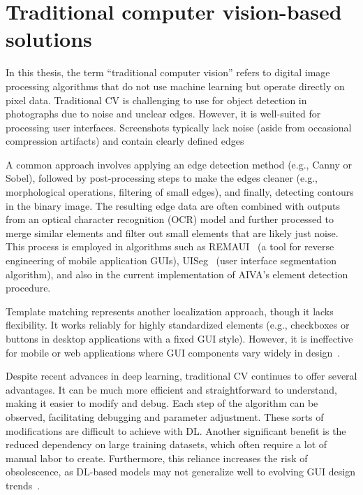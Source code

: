 \documentclass[
  digital,     %
  oneside,     %
  nosansbold,  %
  nocolorbold, %
  lof,         %
  lot,         %
]{fithesis4}
\begin{document}
\section{Traditional computer vision-based solutions}
\label{sec:traditionalCV}

In this thesis, the term \enquote{traditional computer vision} refers to digital image processing algorithms that do not use machine learning but operate directly on pixel data. Traditional CV is challenging to use for object detection in photographs due to noise and unclear edges. However, it is well-suited for processing user interfaces. Screenshots typically lack noise (aside from occasional compression artifacts) and contain clearly defined edges

A common approach involves applying an edge detection method (e.g., Canny or Sobel), followed by post-processing steps to make the edges cleaner (e.g., morphological operations, filtering of small edges), and finally, detecting contours in the binary image. The resulting edge data are often combined with outputs from an optical character recognition (OCR) model and further processed to merge similar elements and filter out small elements that are likely just noise. This process is employed in algorithms such as REMAUI~\cite{remaui} (a tool for reverse engineering of mobile application GUIs), UISeg~\cite{uiseg} (user interface segmentation algorithm), and also in the current implementation of AIVA's element detection procedure.

Template matching represents another localization approach, though it lacks flexibility. It works reliably for highly standardized elements (e.g., checkboxes or buttons in desktop applications with a fixed GUI style). However, it is ineffective for mobile or web applications where GUI components vary widely in design~\cite{ODforGUI_CV_DL_or_both}.

Despite recent advances in deep learning, traditional CV continues to offer several advantages. It can be much more efficient and straightforward to understand, making it easier to modify and debug. Each step of the algorithm can be observed, facilitating debugging and parameter adjustment. These sorts of modifications are difficult to achieve with DL. Another significant benefit is the reduced dependency on large training datasets, which often require a lot of manual labor to create. Furthermore, this reliance increases the risk of obsolescence, as DL-based models may not generalize well to evolving GUI design trends~\cite{DLvsTCV}.
\end{document}
